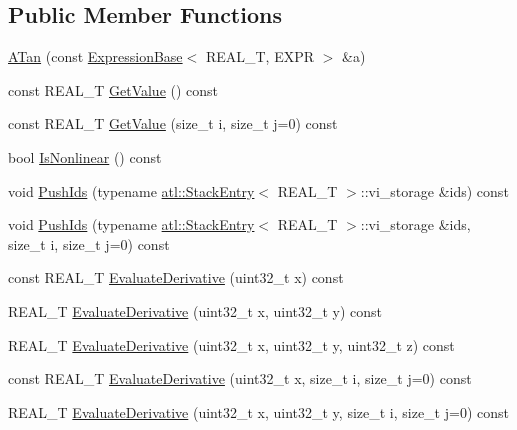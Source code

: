\subsection*{Public Member Functions}
\begin{DoxyCompactItemize}
\item 
\hyperlink{structatl_1_1_a_tan_add096151fe20c8632a60c964878a4902}{A\+Tan} (const \hyperlink{structatl_1_1_expression_base}{Expression\+Base}$<$ R\+E\+A\+L\+\_\+\+T, E\+X\+P\+R $>$ \&a)
\item 
const R\+E\+A\+L\+\_\+\+T \hyperlink{structatl_1_1_a_tan_a0f02fc43a4a82a876e014d7fdaa1a0d9}{Get\+Value} () const 
\item 
const R\+E\+A\+L\+\_\+\+T \hyperlink{structatl_1_1_a_tan_a8eca69dbb72c27a6329e585e38390b47}{Get\+Value} (size\+\_\+t i, size\+\_\+t j=0) const 
\item 
bool \hyperlink{structatl_1_1_a_tan_a597d6ea253a631070cd06f4d2ad4a85e}{Is\+Nonlinear} () const 
\item 
void \hyperlink{structatl_1_1_a_tan_a687a1c79d9db4f2185eabfa553103a2d}{Push\+Ids} (typename \hyperlink{structatl_1_1_stack_entry}{atl\+::\+Stack\+Entry}$<$ R\+E\+A\+L\+\_\+\+T $>$\+::vi\+\_\+storage \&ids) const 
\item 
void \hyperlink{structatl_1_1_a_tan_ab5452739c72b6a25edba0ea6e0bb2a46}{Push\+Ids} (typename \hyperlink{structatl_1_1_stack_entry}{atl\+::\+Stack\+Entry}$<$ R\+E\+A\+L\+\_\+\+T $>$\+::vi\+\_\+storage \&ids, size\+\_\+t i, size\+\_\+t j=0) const 
\item 
const R\+E\+A\+L\+\_\+\+T \hyperlink{structatl_1_1_a_tan_a8abb6fe504290961d22d75e283406e9c}{Evaluate\+Derivative} (uint32\+\_\+t x) const 
\item 
R\+E\+A\+L\+\_\+\+T \hyperlink{structatl_1_1_a_tan_a6499ad9661bb99180537daab6c809ea4}{Evaluate\+Derivative} (uint32\+\_\+t x, uint32\+\_\+t y) const 
\item 
R\+E\+A\+L\+\_\+\+T \hyperlink{structatl_1_1_a_tan_a79de9c67b4b022ace970f951c53ba381}{Evaluate\+Derivative} (uint32\+\_\+t x, uint32\+\_\+t y, uint32\+\_\+t z) const 
\item 
const R\+E\+A\+L\+\_\+\+T \hyperlink{structatl_1_1_a_tan_a075d3de16cb0f1734c92784e8fd2089f}{Evaluate\+Derivative} (uint32\+\_\+t x, size\+\_\+t i, size\+\_\+t j=0) const 
\item 
R\+E\+A\+L\+\_\+\+T \hyperlink{structatl_1_1_a_tan_afaf84b97a4a37b7e4e8d6f9fbbcfc4ef}{Evaluate\+Derivative} (uint32\+\_\+t x, uint32\+\_\+t y, size\+\_\+t i, size\+\_\+t j=0) const 
\item 

\end{DoxyCompactItemize}
